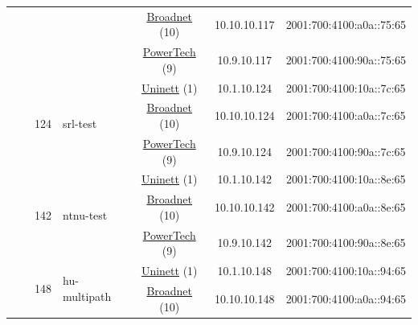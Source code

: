 \begin{small}
\begin{center}
\begin{longtable}{|c|c|c|c|c|c|c|c|}
  &  &  &  & \multicolumn{2}{|c|}{\tiny{\href{https://www.broadnet.no}{Broadnet} (10)}} & \tiny{10.10.10.117} & \tiny{2001:700:4100:a0a::75:65} \\* \cline{5-5}\cline{6-6}\cline{7-7}\cline{8-8}
  &  &  &  & \multicolumn{2}{|c|}{\tiny{\href{http://www.powertech.no}{PowerTech} (9)}} & \tiny{10.9.10.117} & \tiny{2001:700:4100:90a::75:65} \\* \cline{3-3}\cline{4-4}\cline{5-5}\cline{6-6}\cline{7-7}\cline{8-8}
  &  & \multirow{3}{*}{\tiny{124}} & \multicolumn{1}{|l|}{\multirow{3}{*}{\tiny{srl-test}}} & \multicolumn{2}{|c|}{\tiny{\href{https://www.uninett.no}{Uninett} (1)}} & \tiny{10.1.10.124} & \tiny{2001:700:4100:10a::7c:65} \\* \cline{5-5}\cline{6-6}\cline{7-7}\cline{8-8}
  &  &  &  & \multicolumn{2}{|c|}{\tiny{\href{https://www.broadnet.no}{Broadnet} (10)}} & \tiny{10.10.10.124} & \tiny{2001:700:4100:a0a::7c:65} \\* \cline{5-5}\cline{6-6}\cline{7-7}\cline{8-8}
  &  &  &  & \multicolumn{2}{|c|}{\tiny{\href{http://www.powertech.no}{PowerTech} (9)}} & \tiny{10.9.10.124} & \tiny{2001:700:4100:90a::7c:65} \\* \cline{3-3}\cline{4-4}\cline{5-5}\cline{6-6}\cline{7-7}\cline{8-8}
  &  & \multirow{3}{*}{\tiny{142}} & \multicolumn{1}{|l|}{\multirow{3}{*}{\tiny{ntnu-test}}} & \multicolumn{2}{|c|}{\tiny{\href{https://www.uninett.no}{Uninett} (1)}} & \tiny{10.1.10.142} & \tiny{2001:700:4100:10a::8e:65} \\* \cline{5-5}\cline{6-6}\cline{7-7}\cline{8-8}
  &  &  &  & \multicolumn{2}{|c|}{\tiny{\href{https://www.broadnet.no}{Broadnet} (10)}} & \tiny{10.10.10.142} & \tiny{2001:700:4100:a0a::8e:65} \\* \cline{5-5}\cline{6-6}\cline{7-7}\cline{8-8}
  &  &  &  & \multicolumn{2}{|c|}{\tiny{\href{http://www.powertech.no}{PowerTech} (9)}} & \tiny{10.9.10.142} & \tiny{2001:700:4100:90a::8e:65} \\* \cline{3-3}\cline{4-4}\cline{5-5}\cline{6-6}\cline{7-7}\cline{8-8}
  &  & \multirow{3}{*}{\tiny{148}} & \multicolumn{1}{|l|}{\multirow{3}{*}{\tiny{hu-multipath}}} & \multicolumn{2}{|c|}{\tiny{\href{https://www.uninett.no}{Uninett} (1)}} & \tiny{10.1.10.148} & \tiny{2001:700:4100:10a::94:65} \\* \cline{5-5}\cline{6-6}\cline{7-7}\cline{8-8}
  &  &  &  & \multicolumn{2}{|c|}{\tiny{\href{https://www.broadnet.no}{Broadnet} (10)}} & \tiny{10.10.10.148} & \tiny{2001:700:4100:a0a::94:65} \\* \cline{5-5}\cline{6-6}\cline{7-7}\cline{8-8}

\end{longtable}
\end{center}
\end{small}
